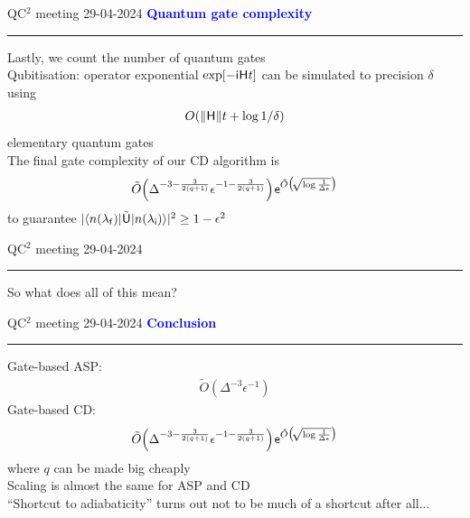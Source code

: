 \documentclass{beamer}
\def\lbt{\small QC$^2$ meeting 29-04-2024} %
\def\mt#1{\kern0.025em\mathsf{#1}\kern0.025em}
\def\e{\mathsf e}
\def\i{\mathsf i}
\def\lambdai{{\lambda_{\sf i}}}
\def\lambdaf{{\lambda_{\sf f}}}
\def\>{\kern0.08em}
\newenvironment{dia}[2]
{
	\begin{frame}
	\vspace{1mm}
	{\small #1}
	\hfill
    {\small\bf\textcolor{blue}{#2}}
	\vspace{3mm}
	\hrule
	\bigskip
}
{
	\vfill
	\end{frame}
}
\begin{document}
\begin{dia}{\lbt}{Quantum gate complexity}
Lastly, we count the number of quantum gates \\[4mm] \pause
Qubitisation: operator exponential $\exp[-\i \mt H t]$ can be simulated to precision $\delta$ using
\begin{align*}
    O(\|\mt H\|t + \log 1 / \delta)
\end{align*}
elementary quantum gates \\[4mm] \pause
The final gate complexity of our CD algorithm is
\begin{align*}
    \tilde O\Big( \Delta^{-3 - \frac3{2(q + 1)}} \epsilon^{-1 - \frac3{2(q + 1)}} \Big) \> \e^{\tilde O\big( \! \sqrt{\log{\frac1{\Delta\epsilon}}} \big)}
\end{align*}
to guarantee $|\bra{n(\lambdaf)} \tilde{\mt U} \ket{n(\lambdai)}|^2 \geq 1 - \epsilon^2$
\vspace{-1cm}
\end{dia}

\begin{dia}{\lbt}{}
\vspace{2.5cm}
\begin{center}
\begin{LARGE}
\textcolor{mygreen}{So what does all of this mean?}
\end{LARGE}
\end{center}
\vspace*{1.5cm}
\end{dia}

\begin{dia}{\lbt}{Conclusion}
Gate-based ASP:
\begin{align*}
    \tilde O(\Delta^{-3} \epsilon^{-1})
\end{align*}
Gate-based CD:
\begin{align*}
    \tilde O\Big( \Delta^{-3 - \frac3{2(q + 1)}} \epsilon^{-1 - \frac3{2(q + 1)}} \Big) \> \e^{\tilde O\big( \! \sqrt{\log{\frac1{\Delta\epsilon}}} \big)}
\end{align*}
where $q$ can be made big cheaply \\[4mm] \pause
Scaling is almost the same for ASP and CD \\[4mm] \pause
``Shortcut to adiabaticity'' turns out not to be much of a shortcut after all...
\end{dia}
\end{document}

